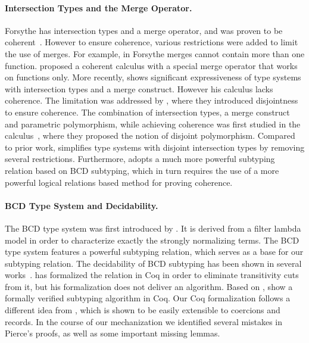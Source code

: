 \paragraph{Intersection Types and the Merge Operator.}
Forsythe has intersection types and a merge operator, and was proven to be
coherent~\citep{Reynolds_1991}. However to ensure coherence, various
restrictions were added to limit the use of merges. For example, in Forsythe
merges cannot contain more than one function. \citet{Castagna_1992} proposed a
coherent calculus with a special merge operator that works on functions only.
More recently, \citet{dunfield2014elaborating} shows significant expressiveness
of type systems with intersection types and a merge construct. However his
calculus lacks coherence. The limitation was addressed by
\citet{oliveira2016disjoint}, where they introduced disjointness to ensure
coherence. The combination of intersection types, a merge construct and
parametric polymorphism, while achieving coherence was first studied in the
\fname calculus~\citep{alpuimdisjoint}, where they proposed the notion of
disjoint polymorphism. Compared to prior work, \name simplifies type systems
with disjoint intersection types by removing several restrictions. 
Furthermore, \name adopts a much more powerful subtyping relation based 
on BCD subtyping, which in turn requires the use of a more powerful
logical relations based method for proving coherence.




\paragraph{BCD Type System and Decidability.}
The BCD type system was first introduced by \citet{Barendregt_1983}. It is
derived from a filter lambda model in order to characterize exactly the strongly
normalizing terms. The BCD type system features a powerful subtyping relation,
which serves as a base for our subtyping relation. The decidability of BCD
subtyping has been shown in several works~\citep{pierce1989decision,
  Kurata_1995, Rehof_2011, Statman_2015}. \citet{laurent2012intersection} has
formalized the relation in Coq in order to eliminate transitivity cuts from it,
but his formalization does not deliver an algorithm. Based on
\citet{Statman_2015}, \citet{bessaiextracting} show a formally verified
subtyping algorithm in Coq. Our Coq formalization follows a different idea from
\citet{pierce1989decision}, which is shown to be easily extensible to coercions
and records. In the course of our mechanization we identified
several mistakes in Pierce's proofs, as well as some important missing lemmas.

